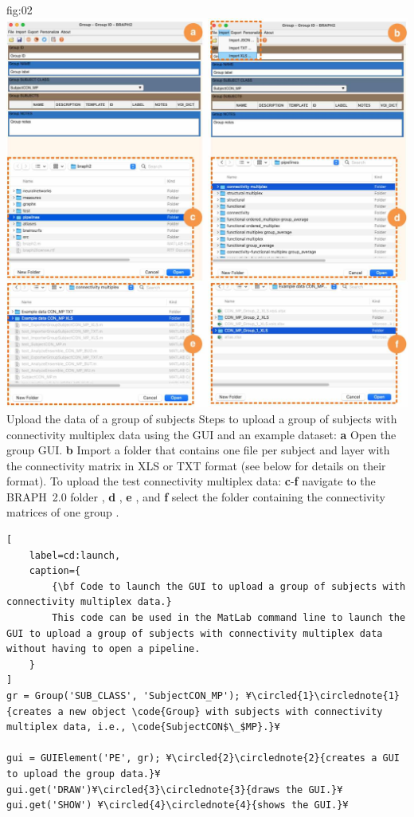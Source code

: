 \documentclass[justified]{tufte-handout}
\begin{document}
	{fig:02}
	{
	\includegraphics{fig02.jpg}
	}
	{Upload the data of a group of subjects}
	{
	Steps to upload a group of subjects with connectivity multiplex data using the GUI and an example dataset: 
	{\bf a} Open the group GUI.
	{\bf b} Import a folder that contains one file per subject and layer with the connectivity matrix in XLS or TXT format (see below for details on their format).
	To upload the test connectivity multiplex data:
	{\bf c}-{\bf f} navigate to the BRAPH~2.0 folder , {\bf d} ,  {\bf e} , and {\bf f} select the folder containing the connectivity matrices of one group .
	}

%
\begin{lstlisting}[
	label=cd:launch,
	caption={
		{\bf Code to launch the GUI to upload a group of subjects with connectivity multiplex data.}
		This code can be used in the MatLab command line to launch the GUI to upload a group of subjects with connectivity multiplex data without having to open a pipeline.
	}
]
gr = Group('SUB_CLASS', 'SubjectCON_MP'); ¥\circled{1}\circlednote{1}{creates a new object \code{Group} with subjects with connectivity multiplex data, i.e., \code{SubjectCON$\_$MP}.}¥

gui = GUIElement('PE', gr); ¥\circled{2}\circlednote{2}{creates a GUI to upload the group data.}¥
gui.get('DRAW')¥\circled{3}\circlednote{3}{draws the GUI.}¥
gui.get('SHOW') ¥\circled{4}\circlednote{4}{shows the GUI.}¥
\end{lstlisting}
\end{document}

